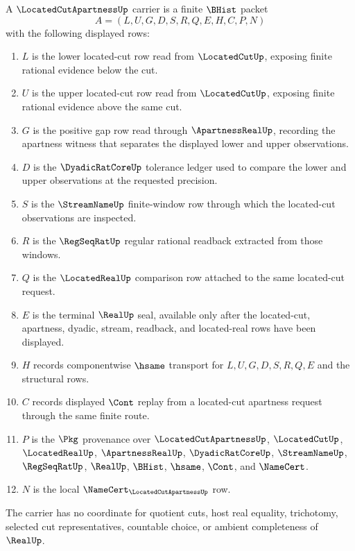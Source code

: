 \begin{definition}
\label{def:located-cut-apartness-carrier}
A $\LocatedCutApartnessUp$ carrier is a finite $\BHist$ packet
$$
A=(L,U,G,D,S,R,Q,E,H,C,P,N)
$$
with the following displayed rows:
\begin{enumerate}
\item $L$ is the lower located-cut row read from $\LocatedCutUp$, exposing finite rational evidence below the cut.
\item $U$ is the upper located-cut row read from $\LocatedCutUp$, exposing finite rational evidence above the same cut.
\item $G$ is the positive gap row read through $\ApartnessRealUp$, recording the apartness witness that separates the displayed lower and upper observations.
\item $D$ is the $\DyadicRatCoreUp$ tolerance ledger used to compare the lower and upper observations at the requested precision.
\item $S$ is the $\StreamNameUp$ finite-window row through which the located-cut observations are inspected.
\item $R$ is the $\RegSeqRatUp$ regular rational readback extracted from those windows.
\item $Q$ is the $\LocatedRealUp$ comparison row attached to the same located-cut request.
\item $E$ is the terminal $\RealUp$ seal, available only after the located-cut, apartness, dyadic, stream, readback, and located-real rows have been displayed.
\item $H$ records componentwise $\hsame$ transport for $L,U,G,D,S,R,Q,E$ and the structural rows.
\item $C$ records displayed $\Cont$ replay from a located-cut apartness request through the same finite route.
\item $P$ is the $\Pkg$ provenance over $\LocatedCutApartnessUp$, $\LocatedCutUp$, $\LocatedRealUp$, $\ApartnessRealUp$, $\DyadicRatCoreUp$, $\StreamNameUp$, $\RegSeqRatUp$, $\RealUp$, $\BHist$, $\hsame$, $\Cont$, and $\NameCert$.
\item $N$ is the local $\NameCert_{\LocatedCutApartnessUp}$ row.
\end{enumerate}
The carrier has no coordinate for quotient cuts, host real equality, trichotomy, selected cut representatives, countable choice, or ambient completeness of $\RealUp$.
\end{definition}

